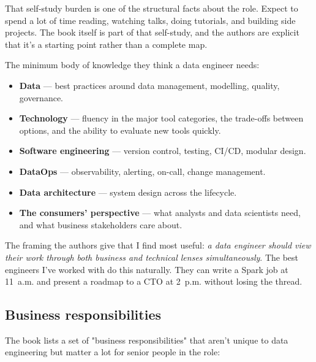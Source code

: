 That self-study burden is one of the structural facts about the role. Expect to spend a lot of time reading, watching talks, doing tutorials, and building side projects. The book itself is part of that self-study, and the authors are explicit that it's a starting point rather than a complete map.

The minimum body of knowledge they think a data engineer needs:

\begin{itemize}[leftmargin=*]
  \item \textbf{Data} — best practices around data management, modelling, quality, governance.
  \item \textbf{Technology} — fluency in the major tool categories, the trade-offs between options, and the ability to evaluate new tools quickly.
  \item \textbf{Software engineering} — version control, testing, CI/CD, modular design.
  \item \textbf{DataOps} — observability, alerting, on-call, change management.
  \item \textbf{Data architecture} — system design across the lifecycle.
  \item \textbf{The consumers' perspective} — what analysts and data scientists need, and what business stakeholders care about.
\end{itemize}

The framing the authors give that I find most useful: \emph{a data engineer should view their work through both business and technical lenses simultaneously}. The best engineers I've worked with do this naturally. They can write a Spark job at 11~a.m. and present a roadmap to a CTO at 2~p.m. without losing the thread.

\subsection{Business responsibilities}

The book lists a set of "business responsibilities" that aren't unique to data engineering but matter a lot for senior people in the role:

